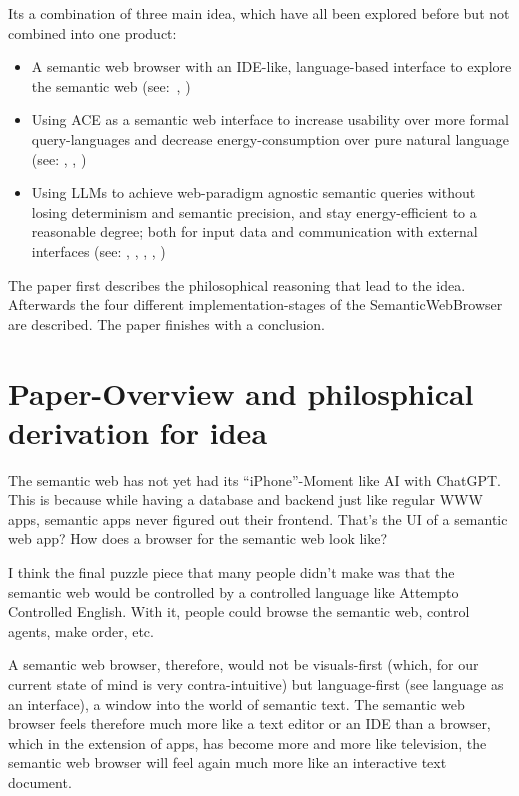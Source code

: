 \documentclass[12pt,a4paper]{article}
\begin{document}
Its a combination of three main idea, which have all been explored before but not combined into one product:

\begin{itemize}
    \item A semantic web browser with an IDE-like, language-based interface to explore the semantic web (see:~\cite{semanticWebBrowser}, \cite{headlessBrowsers})
    \item Using ACE as a semantic web interface to increase usability over more formal query-languages and decrease energy-consumption over pure natural language (see: \cite{semanticWebLanguageBased}, \cite{semanticWebControlledEnglish}, \cite{semanticWebAce})
    \item Using LLMs to achieve web-paradigm agnostic semantic queries without losing determinism and semantic precision, and stay energy-efficient to a reasonable degree; both for input data and communication with external interfaces (see: \cite{llmAsDataTranslator}, \cite{llmForIntegratingHeterogenousData}, \cite{neuroSymbolicAi}, \cite{domainDiscoveryTool}, \cite{schemaInference})
\end{itemize}

The paper first describes the philosophical reasoning that lead to the idea.
Afterwards the four different implementation-stages of the SemanticWebBrowser are described.
The paper finishes with a conclusion.

\section{Paper-Overview and philosphical derivation for idea}

The semantic web has not yet had its ``iPhone''-Moment like AI with ChatGPT. This is because while having a database and backend just like regular WWW apps, semantic apps never figured out their frontend. That's the UI of a semantic web app? How does a browser for the semantic web look like?

I think the final puzzle piece that many people didn't make was that the semantic web would be controlled by a controlled language like Attempto Controlled English. With it, people could browse the semantic web, control agents, make order, etc.

A semantic web browser, therefore, would not be visuals-first (which, for our current state of mind is very contra-intuitive) but language-first (see language as an interface), a window into the world of semantic text. The semantic web browser feels therefore much more like a text editor or an IDE than a browser, which in the extension of apps, has become more and more like television, the semantic web browser will feel again much more like an interactive text document.
\end{document}
